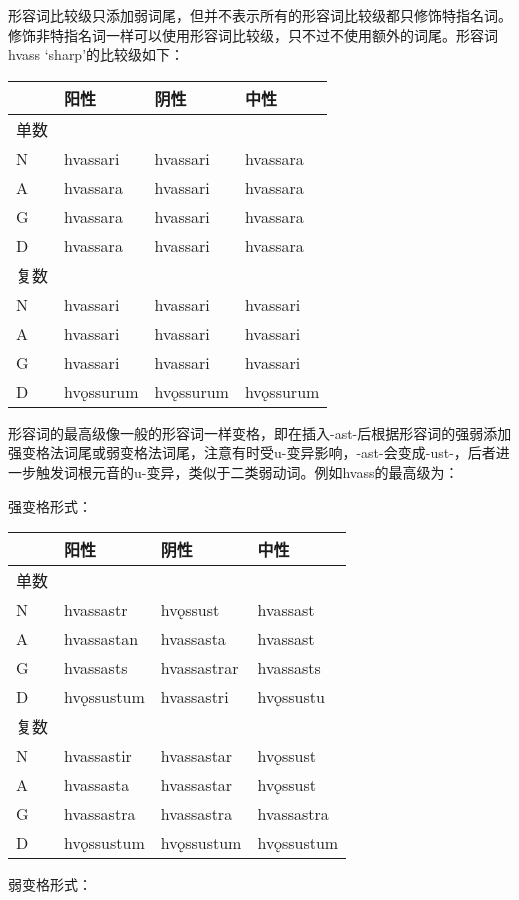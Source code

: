 形容词比较级只添加弱词尾，但并不表示所有的形容词比较级都只修饰特指名词。修饰非特指名词一样可以使用形容词比较级，只不过不使用额外的词尾。形容词hvass
`sharp‌'的比较级如下：

\begin{longtable}{llll}
\toprule
 & 阳性 & 阴性 & 中性 \\
\midrule
\endhead
\bottomrule
\endfoot
单数 & & & \\
N & hvassari & hvassari & hvassara \\
A & hvassara & hvassari & hvassara \\
G & hvassara & hvassari & hvassara \\
D & hvassara & hvassari & hvassara \\
复数 & & & \\
N & hvassari & hvassari & hvassari \\
A & hvassari & hvassari & hvassari \\
G & hvassari & hvassari & hvassari \\
D & hvǫssurum & hvǫssurum & hvǫssurum \\
\end{longtable}

形容词的最高级像一般的形容词一样变格，即在插入-ast-后根据形容词的强弱添加强变格法词尾或弱变格法词尾，注意有时受u-变异影响，-ast-会变成-ust-，后者进一步触发词根元音的u-变异，类似于二类弱动词。例如hvass的最高级为：

强变格形式：

\begin{longtable}{llll}
\toprule
 & 阳性 & 阴性 & 中性 \\
\midrule
\endhead
\bottomrule
\endfoot
单数 & & & \\
N & hvassastr & hvǫssust & hvassast \\
A & hvassastan & hvassasta & hvassast \\
G & hvassasts & hvassastrar & hvassasts \\
D & hvǫssustum & hvassastri & hvǫssustu \\
复数 & & & \\
N & hvassastir & hvassastar & hvǫssust \\
A & hvassasta & hvassastar & hvǫssust \\
G & hvassastra & hvassastra & hvassastra \\
D & hvǫssustum & hvǫssustum & hvǫssustum \\
\end{longtable}

弱变格形式：

